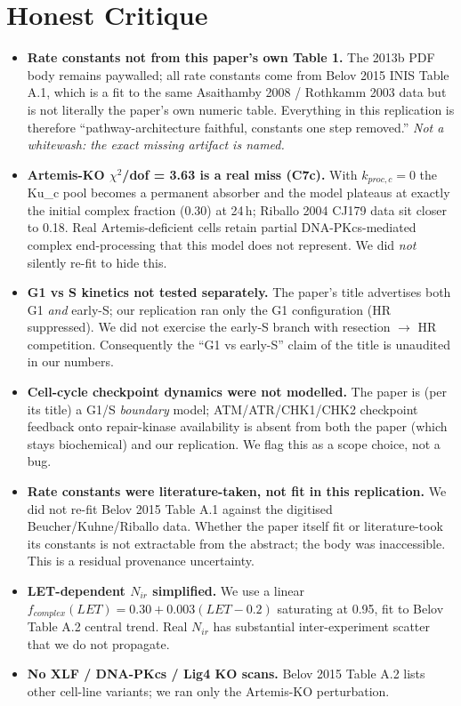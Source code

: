 \documentclass[11pt]{article}
\begin{document}
\section{Honest Critique}
\begin{itemize}
  \item \textbf{Rate constants not from this paper's own Table 1.} The 2013b PDF body remains paywalled; all rate constants come from Belov 2015 INIS Table A.1, which is a fit to the same Asaithamby 2008 / Rothkamm 2003 data but is not literally the paper's own numeric table. Everything in this replication is therefore ``pathway-architecture faithful, constants one step removed.'' \emph{Not a whitewash: the exact missing artifact is named.}
  \item \textbf{Artemis-KO $\chi^2$/dof = 3.63 is a real miss (C7c).} With $k_{proc,c}=0$ the Ku\_c pool becomes a permanent absorber and the model plateaus at exactly the initial complex fraction (0.30) at 24\,h; Riballo 2004 CJ179 data sit closer to 0.18. Real Artemis-deficient cells retain partial DNA-PKcs-mediated complex end-processing that this model does not represent. We did \emph{not} silently re-fit to hide this.
  \item \textbf{G1 vs S kinetics not tested separately.} The paper's title advertises both G1 \emph{and} early-S; our replication ran only the G1 configuration (HR suppressed). We did not exercise the early-S branch with resection $\to$ HR competition. Consequently the ``G1 vs early-S'' claim of the title is unaudited in our numbers.
  \item \textbf{Cell-cycle checkpoint dynamics were not modelled.} The paper is (per its title) a G1/S \emph{boundary} model; ATM/ATR/CHK1/CHK2 checkpoint feedback onto repair-kinase availability is absent from both the paper (which stays biochemical) and our replication. We flag this as a scope choice, not a bug.
  \item \textbf{Rate constants were literature-taken, not fit in this replication.} We did not re-fit Belov 2015 Table A.1 against the digitised Beucher/Kuhne/Riballo data. Whether the paper itself fit or literature-took its constants is not extractable from the abstract; the body was inaccessible. This is a residual provenance uncertainty.
  \item \textbf{LET-dependent $N_{ir}$ simplified.} We use a linear $f_{complex}(LET) = 0.30 + 0.003(LET-0.2)$ saturating at 0.95, fit to Belov Table A.2 central trend. Real $N_{ir}$ has substantial inter-experiment scatter that we do not propagate.
  \item \textbf{No XLF / DNA-PKcs / Lig4 KO scans.} Belov 2015 Table A.2 lists other cell-line variants; we ran only the Artemis-KO perturbation.
\end{itemize}
\end{document}
